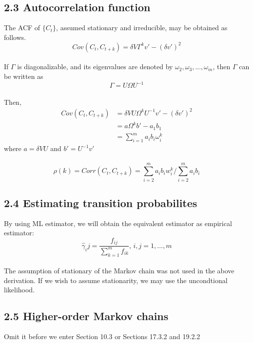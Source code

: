 \documentclass{article}
\begin{document}
\subsection*{2.3 Autocorrelation function}
The ACF of $\{C_t\}$, assumed stationary and irreducible, may be obtained as follows.
$$Cov(C_t, C_{t+k}) = \delta V \Gamma^k v' - (\delta v')^2$$
\\
If $\Gamma$ is diagonalizable, and its eigenvalues are denoted by $\omega_2, \omega_3, ..., \omega_m$, then $\Gamma$ can be written as
$$\Gamma = U \Omega U^{-1}$$
\\
Then, 
\begin{align}
    Cov(C_t, C_{t+k}) & = \delta V U \Omega^k U^{-1} v' - (\delta v')^2 \\
    & = a \Omega^k b' - a_1 b_1 \\
    & = \sum_{i=1}^m a_i b_i \omega_i^k
\end{align}
where $a = \delta V U$ and $b' = U^{-1} v'$ \\
\\
$$\rho(k) = Corr(C_t, C_{t+k}) = \sum_{i=2}^m a_i b_i w_i^k / \sum_{i=2}^m a_i b_i$$

\subsection*{2.4 Estimating transition probabilites}

By using ML estimator, we will obtain the equivalent estimator as empirical estimator:
$$\hat{\gamma}_ij = \frac{f_{ij}}{\sum_{k=1}^m f_{ik}} \text{, $i, j = 1, ..., m$}$$
\\
The assumption of stationary of the Markov chain was not used in the above derivation. If we wish to assume stationarity, we may use the uncondtional likelihood. 

\subsection*{2.5 Higher-order Markov chains}

Omit it before we enter Section 10.3 or Sections 17.3.2 and 19.2.2
\end{document}
